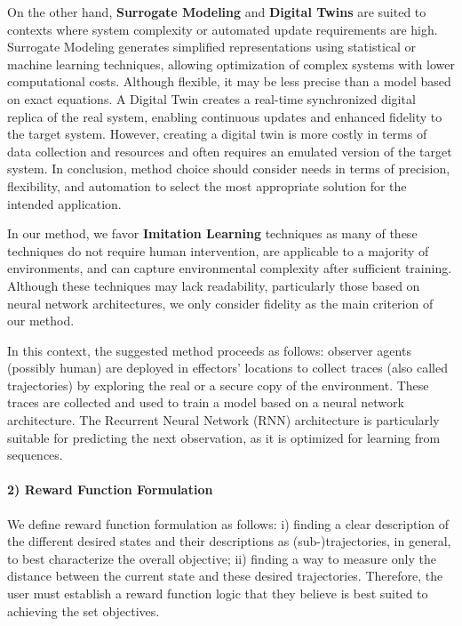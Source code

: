 \documentclass[sigconf,anonymous]{aamas}
\begin{document}
On the other hand, \textbf{Surrogate Modeling} and \textbf{Digital Twins} are suited to contexts where system complexity or automated update requirements are high. Surrogate Modeling generates simplified representations using statistical or machine learning techniques, allowing optimization of complex systems with lower computational costs. Although flexible, it may be less precise than a model based on exact equations. A Digital Twin creates a real-time synchronized digital replica of the real system, enabling continuous updates and enhanced fidelity to the target system. However, creating a digital twin is more costly in terms of data collection and resources and often requires an emulated version of the target system. In conclusion, method choice should consider needs in terms of precision, flexibility, and automation to select the most appropriate solution for the intended application.

In our method, we favor \textbf{Imitation Learning} techniques as many of these techniques do not require human intervention, are applicable to a majority of environments, and can capture environmental complexity after sufficient training. Although these techniques may lack readability, particularly those based on neural network architectures, we only consider fidelity as the main criterion of our method.

In this context, the suggested method proceeds as follows: observer agents (possibly human) are deployed in effectors' locations to collect traces (also called trajectories) by exploring the real or a secure copy of the environment. These traces are collected and used to train a model based on a neural network architecture. The Recurrent Neural Network (RNN) architecture is particularly suitable for predicting the next observation, as it is optimized for learning from sequences.

\paragraph{\textbf{2) Reward Function Formulation}} \quad

\noindent We define reward function formulation as follows: \quad i) finding a clear description of the different desired states and their descriptions as (sub-)trajectories, in general, to best characterize the overall objective; \quad ii) finding a way to measure only the distance between the current state and these desired trajectories. Therefore, the user must establish a reward function logic that they believe is best suited to achieving the set objectives.
\end{document}
